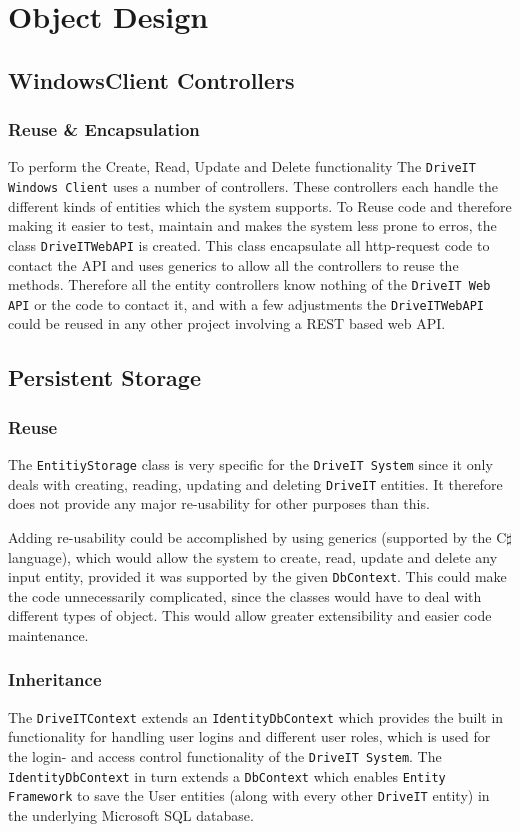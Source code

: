 \section{Object Design}
\subsection{WindowsClient Controllers}
\subsubsection{Reuse \& Encapsulation}
To perform the Create, Read, Update and Delete functionality The \texttt{DriveIT Windows Client} uses a number of controllers. These controllers each handle the different kinds of entities which the system supports. To Reuse code and therefore making it easier to test, maintain and makes the system less prone to erros, the class \texttt{DriveITWebAPI} is created. This class encapsulate all http-request code to contact the API and uses generics to allow all the controllers to reuse the methods. 
Therefore all the entity controllers know nothing of the \texttt{DriveIT Web API} or the code to contact it, and with a few adjustments the \texttt{DriveITWebAPI} could be reused in any other project involving a REST based web API.

\subsection{Persistent Storage}

\subsubsection{Reuse}
The \texttt{EntitiyStorage} class is very specific for the \texttt{DriveIT System} since it only deals with creating, reading, updating and deleting \texttt{DriveIT} entities. It therefore does not provide any major re-usability for other purposes than this. 

Adding re-usability could be accomplished by using generics (supported by the C$\sharp$ language), which would allow the system to create, read, update and delete any input entity, provided it was supported by the given \texttt{DbContext}. This could make the code unnecessarily complicated, since the classes would have to deal with different types of object. This would allow greater extensibility and easier code maintenance.

\subsubsection{Inheritance}
The \texttt{DriveITContext} extends an \texttt{IdentityDbContext} which provides the built in functionality for handling user logins and different user roles, which is used for the login- and access control functionality of the \texttt{DriveIT System}.
The \texttt{IdentityDbContext} in turn extends a \texttt{DbContext} which enables \texttt{Entity Framework} to save the User entities (along with every other \texttt{DriveIT} entity) in the underlying Microsoft SQL database.

